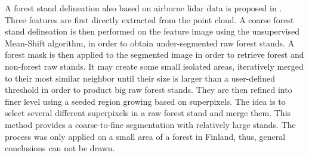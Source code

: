 A forest stand delineation also based on airborne lidar data is proposed in \citep{wu2014data}. Three features are first directly extracted from the point cloud. A coarse forest stand delineation is then performed on the feature image using the unsupervised Mean-Shift algorithm, in order to obtain under-segmented raw forest stands. A forest mask is then applied to the segmented image in order to retrieve forest and non-forest raw stands. It may create some small isolated areas, iteratively merged to their most similar neighbor until their size is larger than a user-defined threshold in order to product big raw forest stands. They are then refined into finer level using a seeded region growing based on superpixels. The idea is to select several different superpixels in a raw forest stand and merge them. This method provides a coarse-to-fine segmentation with relatively large stands. The process was only applied on a small area of a forest in Finland, thus, general conclusions can not be drawn. \\

